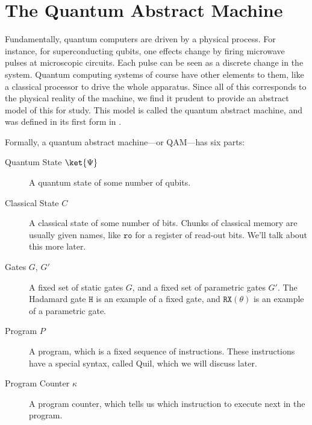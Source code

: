 
\section{The Quantum Abstract Machine}
Fundamentally, quantum computers are driven by a physical process. For instance, for
superconducting qubits, one effects change by firing microwave pulses at microscopic
circuits. Each pulse can be seen as a discrete change in the system. Quantum computing
systems of course have other elements to them, like a classical processor to drive the
whole apparatus. Since all of this corresponds to the physical reality of the machine,
we find it prudent to provide an abstract model of this for study. This model is called
the quantum abstract machine, and was defined in its first form in \cite{quilpaper}.

Formally, a quantum abstract machine---or QAM---has six parts:
\begin{description}
\item[Quantum State $\ket{\Psi}$] A quantum state of some number of qubits.
\item[Classical State $C$] A classical state of some number of bits. Chunks of classical memory are usually given names, like $\mathtt{ro}$ for a register of read-out bits. We'll talk about this more later.
\item[Gates $G$, $G'$] A fixed set of static gates $G$, and a fixed set of parametric gates $G'$. The Hadamard gate $\texttt{H}$ is an example of a fixed gate, and $\mathtt{RX}(\theta)$ is an example of a parametric gate.
\item[Program $P$] A program, which is a fixed sequence of instructions. These instructions have a special syntax, called Quil, which we will discuss later.
\item[Program Counter $\kappa$] A program counter, which tells us which instruction to execute next in the program.
\end{description}

